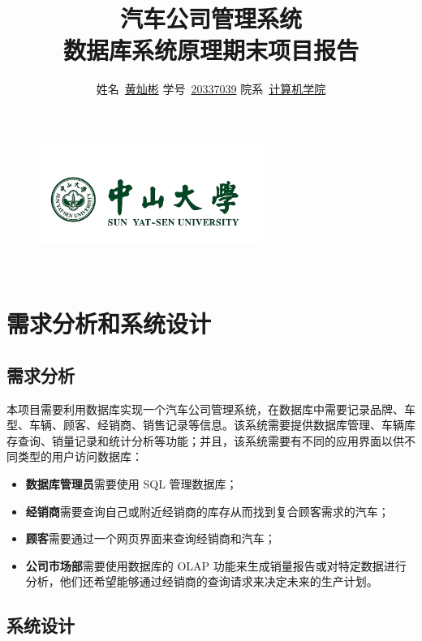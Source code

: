 \documentclass[hyperref,a4paper,UTF8]{ctexart}
\title{\textbf{{汽车公司管理系统} \\ \large{数据库系统原理期末项目报告}}}
\author{
\kaishu\normalsize
姓名\ \underline{黄灿彬} \qquad
学号\ \underline{20337039} \qquad
院系\ \underline{计算机学院}
}
\date{} %
\begin{document}
\begin{figure}
    \centering
    \includegraphics[width=0.65\textwidth]{figures/sysu.png}
\end{figure}

\maketitle

\

\tableofcontents

\thispagestyle{empty} %
\newpage

\section{需求分析和系统设计}

\subsection{需求分析}

本项目需要利用数据库实现一个汽车公司管理系统，在数据库中需要记录品牌、车型、车辆、顾客、经销商、销售记录等信息。该系统需要提供数据库管理、车辆库存查询、销量记录和统计分析等功能；并且，该系统需要有不同的应用界面以供不同类型的用户访问数据库：

\begin{itemize}[itemsep=2pt,topsep=0pt,parsep=0pt]
    \item \textbf{数据库管理员}需要使用 SQL 管理数据库；
    \item \textbf{经销商}需要查询自己或附近经销商的库存从而找到复合顾客需求的汽车；
    \item \textbf{顾客}需要通过一个网页界面来查询经销商和汽车；
    \item \textbf{公司市场部}需要使用数据库的 OLAP 功能来生成销量报告或对特定数据进行分析，他们还希望能够通过经销商的查询请求来决定未来的生产计划。
\end{itemize}

\subsection{系统设计}
\end{document}
